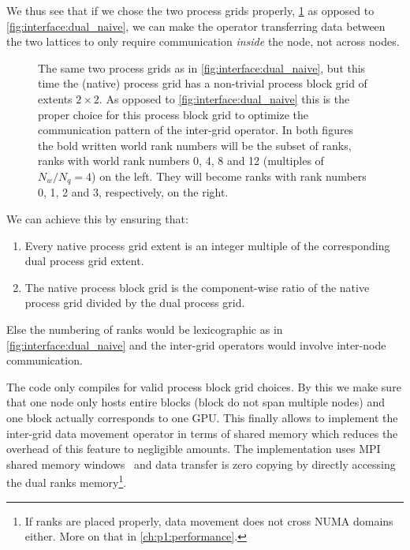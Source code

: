 We thus see that if we chose the two process grids properly, \cref{fig:interface:dual_blk} as opposed to \cref{fig:interface:dual_naive}, we can make the operator transferring data between the two lattices to only require communication \emph{inside} the node, not across nodes.
\begin{figure}
  
  \caption{The same two process grids as in \cref{fig:interface:dual_naive}, but this time the \openqxd (native) process grid has a non-trivial process block grid of extents $2 \times 2$. As opposed to \cref{fig:interface:dual_naive} this is the proper choice for this process block grid to optimize the communication pattern of the inter-grid operator. In both figures the bold written world rank numbers will be the subset of \quda ranks, \ie ranks with world rank numbers \num{0}, \num{4}, \num{8} and \num{12} (multiples of $N_w/N_q = 4$) on the left. They will become ranks with \quda rank numbers \num{0}, \num{1}, \num{2} and \num{3}, respectively, on the right.}
  \label{fig:interface:dual_blk}
\end{figure}
We can achieve this by ensuring that:
\begin{enumerate}
  \item Every native process grid extent is an integer multiple of the corresponding dual process grid extent.
  \item The native process block grid is the component-wise ratio of the native process grid divided by the dual process grid.
\end{enumerate}
Else the numbering of ranks would be lexicographic as in \cref{fig:interface:dual_naive} and the inter-grid operators would involve inter-node communication.

The code only compiles for valid process block grid choices.
By this we make sure that one node only hosts entire blocks (block do not span multiple nodes) and one block actually corresponds to one GPU.
This finally allows to implement the inter-grid data movement operator in terms of shared memory which reduces the overhead of this feature to negligible amounts.
The implementation uses MPI shared memory windows~\cite{standard:mpi-3.0} and data transfer is zero copying by directly accessing the dual ranks memory\footnote{If ranks are placed properly, data movement does not cross NUMA domains either. More on that in \cref{ch:p1:performance}.}.


